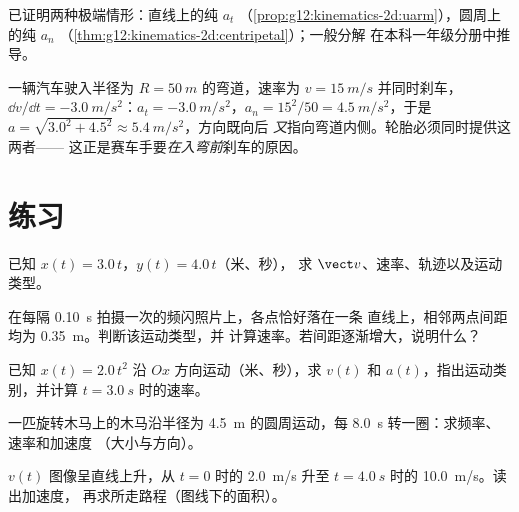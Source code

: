 \begin{remark}[证明的出处]\label{rem:g12:kinematics-2d:frenetproof}
已证明两种极端情形：直线上的纯 $a_t$
（\cref{prop:g12:kinematics-2d:uarm}），圆周上的纯 $a_n$
（\cref{thm:g12:kinematics-2d:centripetal}）；一般分解
在本科一年级分册中推导。
\end{remark}

\begin{example}[刹车进入弯道]\label{ex:g12:kinematics-2d:bend}
一辆汽车驶入半径为 $R = \qty{50}{m}$ 的弯道，速率为 $v = \qty{15}{m/s}$
并同时刹车，$\dd v/\dd t = \qty{-3.0}{m/s^2}$：$a_t =
\qty{-3.0}{m/s^2}$，$a_n = 15^2/50 = \qty{4.5}{m/s^2}$，于是 $a =
\sqrt{3.0^2 + 4.5^2} \approx \qty{5.4}{m/s^2}$，方向既向后
\emph{又}指向弯道内侧。轮胎必须同时提供这两者——
这正是赛车手要\emph{在入弯前}刹车的原因。
\end{example}

\section{练习}

\begin{exercise}[$\star$]\label{exo:g12:kinematics-2d:1}
已知 $x(t) = 3.0\,t$，$y(t) = 4.0\,t$（米、秒），
求 $\vect v$、速率、轨迹以及运动类型。
\end{exercise}

\begin{exercise}[$\star$]\label{exo:g12:kinematics-2d:2}
在每隔 \qty{0.10}{s} 拍摄一次的频闪照片上，各点恰好落在一条
直线上，相邻两点间距均为 \qty{0.35}{m}。判断该运动类型，并
计算速率。若间距逐渐增大，说明什么？
\end{exercise}

\begin{exercise}[$\star$]\label{exo:g12:kinematics-2d:3}
已知 $x(t) = 2.0\,t^2$ 沿 $Ox$ 方向运动（米、秒），求 $v(t)$
和 $a(t)$，指出运动类别，并计算
$t = \qty{3.0}{s}$ 时的速率。
\end{exercise}

\begin{exercise}[$\star$]\label{exo:g12:kinematics-2d:4}
一匹旋转木马上的木马沿半径为 \qty{4.5}{m} 的圆周运动，每
\qty{8.0}{s} 转一圈：求频率、速率和加速度
（大小与方向）。
\end{exercise}

\begin{exercise}[$\star$]\label{exo:g12:kinematics-2d:5}
$v(t)$ 图像呈直线上升，从 $t = 0$ 时的 \qty{2.0}{m/s}
升至 $t = \qty{4.0}{s}$ 时的 \qty{10.0}{m/s}。读出加速度，
再求所走路程（图线下的面积）。
\end{exercise}

